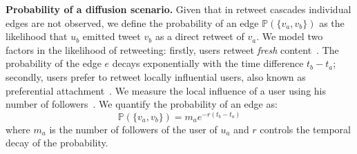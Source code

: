 \textbf{Probability of a diffusion scenario.}
Given that in retweet cascades individual edges are not observed,
we define the probability of an edge $\mathds{P}(\{v_a, v_b\})$ as the likelihood that $u_b$ emitted tweet $v_b$ as a direct retweet of $v_a$.
We model two factors in the likelihood of retweeting:
%
%
firstly, users retweet \emph{fresh} content~\cite{Wu2007}.
The probability of the edge $e$ decays exponentially with the time difference $t_b - t_a$;
secondly, users prefer to retweet locally influential users, also known as preferential attachment~\cite{Barabasi2005}.
We measure the local influence of a user using his number of followers~\cite{kwak2010twitter,Cha2010,Rizoiu2017}.
We quantify the probability of an edge as:
\begin{equation} \label{eq:prob-edge}
	\mathds{P}(\{v_a, v_b\}) = m_a e^{-r({t_{b}-t_{a}})}
\end{equation}
where 
$m_a$ is the number of followers of the user of $u_a$ and
$r$ controls the temporal decay of the probability.

